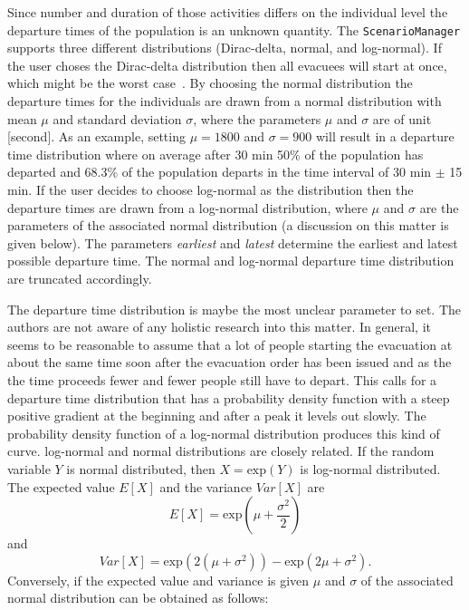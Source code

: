 \begin{itemize}
Since number and duration of those activities differs on the individual level the departure times of the population is an unknown quantity. The \verb+ScenarioManager+ supports three different distributions (Dirac-delta, normal, and log-normal). If the user choses the Dirac-delta distribution then all evacuees will start at once, which might be the worst case~\citep{LaemmelKluepfel2012InfluenceOfDepartureTimeDistribution}. By choosing the normal distribution the departure times for the individuals are drawn from a normal distribution with mean $\mu$ and standard deviation $\sigma$, where the parameters $\mu$ and $\sigma$ are of unit [second]. As an example, setting $\mu = 1800$ and $\sigma =  900$ will result in a departure time distribution where on average after 30 min 50\% of the population has departed and 68.3\% of the population departs in the time interval of 30 min $\pm$ 15 min. If the user decides to choose log-normal as the distribution then the departure times are drawn from a log-normal distribution, where $\mu$ and $\sigma$ are the parameters of the associated normal distribution (a discussion on this matter is given below). The parameters \emph{earliest} and \emph{latest} determine the earliest and latest possible departure time. The normal and log-normal departure time distribution are truncated accordingly.
\end{itemize}
The departure time distribution is maybe the most unclear parameter to set. The authors are not aware of any holistic research into this matter. 
In general, it seems to be reasonable to assume that a lot of people starting the evacuation at about the same time soon after the evacuation order has been issued and as the the time proceeds fewer and fewer people still have to depart. 
This calls for a departure time distribution that has a probability density function with a steep positive gradient at the beginning and after a peak it levels out slowly. The probability density function of a log-normal distribution produces this kind of curve. log-normal and normal distributions are closely related. If the random variable $Y$ is normal distributed, then $X = \text{exp}(Y)$ is log-normal distributed. The expected value $E[X]$  and the variance $Var[X]$ are
\begin{equation}
E[X] = \text{exp}(\mu + \frac{\sigma^2}{2})
\end{equation}
and 
\begin{equation}
Var[X]=\text{exp}(2(\mu+\sigma^2))-\text{exp}(2\mu+\sigma^2).
\end{equation}
Conversely, if the expected value and variance is given $\mu$ and $\sigma$ of the associated normal distribution can be obtained as follows:
